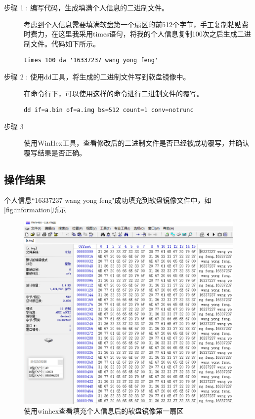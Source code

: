 \documentclass[forprint]{WHUBachelor}
\begin{document}
\begin{description}
  \item [步骤 1 : 编写代码，生成填满个人信息的二进制文件。] 

  考虑到个人信息需要填满软盘第一个扇区的前512个字节，手工复制粘贴费时费力，在这里我采用times语句，将我的个人信息复制100次之后生成二进制文件。代码如下所示。
  \label{code:generate_infomation}
  \begin{lstlisting}
times 100 dw '16337237 wang yong feng'
  \end{lstlisting}

  \item [步骤 2 : 使用dd工具，将生成的二进制文件写到软盘镜像中。] 
  
  在命令行下，可以使用这样的命令进行二进制文件的覆写。

  \begin{lstlisting}
dd if=a.bin of=a.img bs=512 count=1 conv=notrunc
  \end{lstlisting}

  \item [步骤 3] 使用WinHex工具，查看修改后的二进制文件是否已经被成功覆写，并确认覆写结果是否正确。
\end{description}

\subsection{操作结果}

个人信息“16337237 wang yong feng"成功填充到软盘镜像文件中，如\autoref{fig:information}所示

\begin{figure}[htp]
  \centering
  \includegraphics[width=14cm]{"./figure/information.png"}
  \caption{使用winhex查看填充个人信息后的软盘镜像第一扇区}
  \label{fig:information}
\end{figure}
\end{document}
